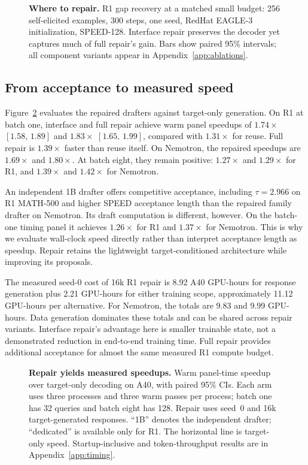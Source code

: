 \documentclass[11pt]{article}
\newcommand{\ci}[2]{[#1,\,#2]}
\begin{document}
\begin{figure}[t]
\centering

\caption{\textbf{Where to repair.} R1 gap recovery at a matched small budget: 256 self-elicited examples, 300 steps, one seed, RedHat EAGLE-3 initialization, SPEED-128. Interface repair preserves the decoder yet captures much of full repair's gain. Bars show paired 95\% intervals; all component variants appear in Appendix~\ref{app:ablations}.}
\label{fig:components}
\end{figure}

\subsection{From acceptance to measured speed}
Figure~\ref{fig:timing} evaluates the repaired drafters against target-only generation. On R1 at batch one, interface and full repair achieve warm panel speedups of $1.74\times$ $\ci{1.58}{1.89}$ and $1.83\times$ $\ci{1.65}{1.99}$, compared with $1.31\times$ for reuse. Full repair is $1.39\times$ faster than reuse itself. On Nemotron, the repaired speedups are $1.69\times$ and $1.80\times$. At batch eight, they remain positive: $1.27\times$ and $1.29\times$ for R1, and $1.39\times$ and $1.42\times$ for Nemotron.

An independent 1B drafter offers competitive acceptance, including $\tau=2.966$ on R1 MATH-500 and higher SPEED acceptance length than the repaired family drafter on Nemotron. Its draft computation is different, however. On the batch-one timing panel it achieves $1.26\times$ for R1 and $1.37\times$ for Nemotron. This is why we evaluate wall-clock speed directly rather than interpret acceptance length as speedup. Repair retains the lightweight target-conditioned architecture while improving its proposals.

The measured seed-0 cost of 16k R1 repair is 8.92 A40 GPU-hours for response generation plus 2.21 GPU-hours for either training scope, approximately 11.12 GPU-hours per alternative. For Nemotron, the totals are 9.83 and 9.99 GPU-hours. Data generation dominates these totals and can be shared across repair variants. Interface repair's advantage here is smaller trainable state, not a demonstrated reduction in end-to-end training time. Full repair provides additional acceptance for almost the same measured R1 compute budget.

\begin{figure}[t]
\centering

\caption{\textbf{Repair yields measured speedups.} Warm panel-time speedup over target-only decoding on A40, with paired 95\% CIs. Each arm uses three processes and three warm passes per process; batch one has 32 queries and batch eight has 128. Repair uses seed~0 and 16k target-generated responses. ``1B'' denotes the independent drafter; ``dedicated'' is available only for R1. The horizontal line is target-only speed. Startup-inclusive and token-throughput results are in Appendix~\ref{app:timing}.}
\label{fig:timing}
\end{figure}
\end{document}

